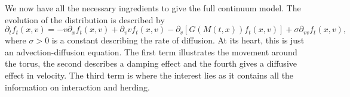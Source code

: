 		We now have all the necessary ingredients to give the full continuum model. The evolution of the distribution is described by
		\begin{equation}\label{eq:fullPDE}
			\partial_t f_t(x,v) = -v\partial_x f_t(x,v)  +\partial_v v f_t(x,v) - \partial_v \left[ G(M(t,x))f_t(x,v)\right] + \sigma \partial_{vv}f_t(x,v),
		\end{equation}
		where $\sigma > 0$ is a constant describing the rate of diffusion. At its heart, this is just an advection-diffusion equation. The first term illustrates the movement around the torus, the second describes a damping effect and the fourth gives a diffusive effect in velocity. The third term is where the interest lies as it contains all the information on interaction and herding.
		